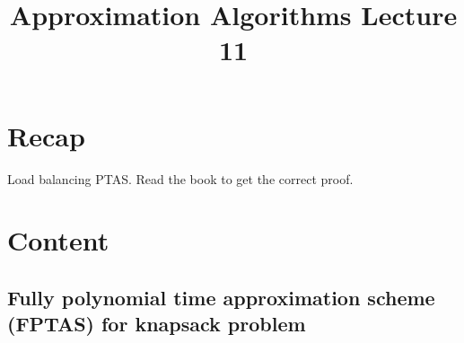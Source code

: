 \documentclass[a4paper]{article}
\title{\textbf{Approximation Algorithms Lecture 11}}
\date{}
\begin{document}
\maketitle
\tableofcontents

\section{Recap}

Load balancing PTAS. Read the book to get the correct proof.

\section{Content}

\subsection{Fully polynomial time approximation scheme (FPTAS) for knapsack problem}
\end{document}
